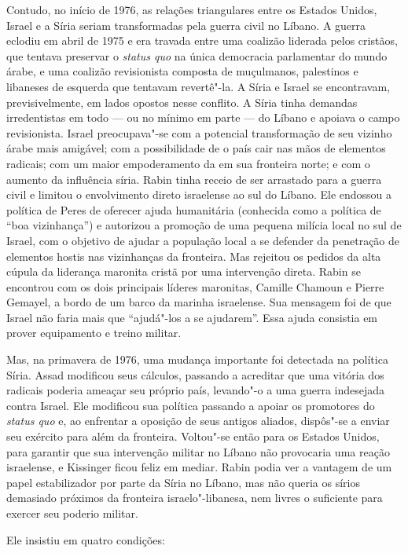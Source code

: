 Contudo, no início de 1976, as relações triangulares entre os Estados Unidos,
Israel e a Síria seriam transformadas pela guerra civil no Líbano. A
guerra eclodiu em abril de 1975 e era travada entre uma coalizão
liderada pelos cristãos, que tentava preservar o \emph{status quo} na
única democracia parlamentar do mundo árabe, e uma coalizão revisionista
composta de muçulmanos, palestinos e libaneses de esquerda que tentavam
revertê"-la. A Síria e Israel se encontravam, previsivelmente, em lados
opostos nesse conflito. A Síria tinha demandas irredentistas em todo ---
ou no mínimo em parte --- do Líbano e apoiava o campo revisionista.
Israel preocupava"-se com a potencial transformação de seu vizinho árabe
mais amigável; com a possibilidade de o país cair nas mãos de elementos
radicais; com um maior empoderamento da  em sua fronteira norte; e
com o aumento da influência síria. Rabin tinha receio de ser arrastado
para a guerra civil e limitou o envolvimento direto israelense ao sul do
Líbano. Ele endossou a política de Peres de oferecer ajuda humanitária
(conhecida como a política de ``boa vizinhança'') e autorizou a promoção de
uma pequena milícia local no sul de Israel, com o objetivo de ajudar a população
local a se defender da penetração de elementos hostis nas vizinhanças da
fronteira. Mas rejeitou os pedidos da alta cúpula da liderança maronita
cristã por uma intervenção direta. Rabin se encontrou com os dois
principais líderes maronitas, Camille Chamoun e Pierre Gemayel, a bordo
de um barco da marinha israelense. Sua mensagem foi de que Israel não
faria mais que ``ajudá"-los a se ajudarem''. Essa ajuda consistia em
prover equipamento e treino militar.

Mas, na primavera de 1976, uma mudança importante foi detectada na
política Síria. Assad modificou seus cálculos, passando a acreditar que
uma vitória dos radicais poderia ameaçar seu próprio país, levando"-o a
uma guerra indesejada contra Israel. Ele modificou sua política passando
a apoiar os promotores do \emph{status quo} e, ao enfrentar a oposição
de seus antigos aliados, dispôs"-se a enviar seu exército para além da
fronteira. Voltou"-se então para os Estados Unidos, para garantir que sua
intervenção militar no Líbano não provocaria uma reação israelense, e
Kissinger ficou feliz em mediar. Rabin podia ver a vantagem de um papel
estabilizador por parte da Síria no Líbano, mas não queria os sírios
demasiado próximos da fronteira israelo"-libanesa, nem livres o
suficiente para exercer seu poderio militar.

Ele insistiu em quatro condições:

